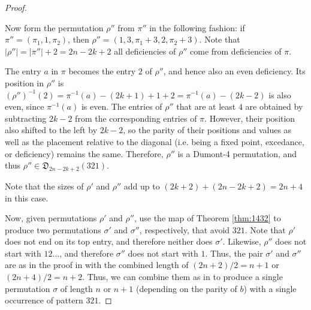 \documentclass[
final
]{dmtcs-episciences}
\theoremstyle{definition}
\theoremstyle{remark}
\begin{document}
\begin{proof}
\begin{enumerate}
Now form the permutation $\rho''$ from $\pi''$ in the following fashion: if $\pi''=(\pi_1, 1, \pi_2)$, then $\rho''=(1,3,\pi_1+3,2,\pi_2+3)$. Note that $|\rho''|=|\pi''|+2=2n-2k+2$ all deficiencies of $\rho''$ come from deficiencies of $\pi$. 

The entry $a$ in $\pi$ becomes the entry $2$ of $\rho''$, and hence also an even deficiency. Its position in $\rho''$ is $(\rho'')^{-1}(2)=\pi^{-1}(a)-(2k+1)+1+2=\pi^{-1}(a)-(2k-2)$ is also even, since $\pi^{-1}(a)$ is even. The entries of $\rho''$ that are at least $4$ are obtained by subtracting $2k-2$ from the corresponding entries of $\pi$. However, their position also shifted to the left by $2k-2$, so the parity of their positions and values as well as the placement relative to the diagonal (i.e. being a fixed point, excedance, or deficiency) remains the same. Therefore, $\rho''$ is a Dumont-4 permutation, and thus $\rho''\in\mathfrak{D}_{2n-2k+2}(321)$.

Note that the sizes of $\rho'$ and $\rho''$ add up to $(2k+2)+(2n-2k+2)=2n+4$ in this case.

\end{enumerate}


Now, given permutations $\rho'$ and $\rho''$, use the map of Theorem \ref{thm:1432} to produce two permutations $\sigma'$ and $\sigma''$, respectively, that avoid $321$. Note that $\rho'$ does not end on its top entry, and therefore neither does $\sigma'$. Likewise, $\rho''$ does not start with $12\dots$, and therefore $\sigma''$ does not start with $1$. Thus, the pair $\sigma'$ and $\sigma''$ are as in the proof in \cite {Burstein_Short} with the combined length of $(2n+2)/2=n+1$ or $(2n+4)/2=n+2$. Thus, we can combine them as in \cite {Burstein_Short} to produce a single permutation $\sigma$ of length $n$ or $n+1$ (depending on the parity of $b$) with a single occurrence of pattern $321$.


\end{proof}
\end{document}
